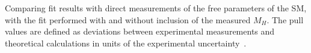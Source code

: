 Comparing fit results with direct measurements
of the free parameters of the SM, with the fit performed
with and without inclusion of the measured $M_H$. 
The pull values are defined as deviations between experimental 
measurements and theoretical calculations in units of the experimental uncertainty~\cite{Baak:2012kk}. 
